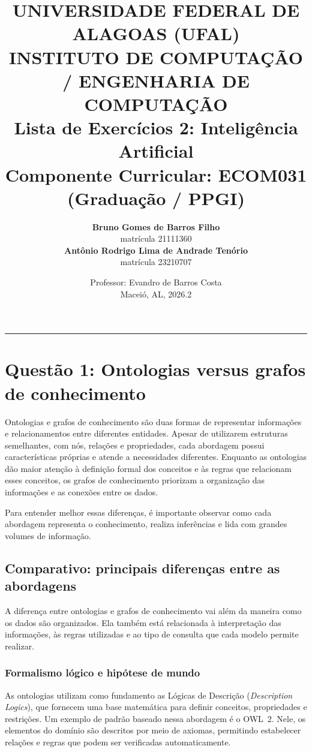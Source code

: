 \documentclass[12pt, a4paper]{article}
\title{
  {\large\textbf{UNIVERSIDADE FEDERAL DE ALAGOAS (UFAL)}}\\[0.2em]
  {\large\textbf{INSTITUTO DE COMPUTAÇÃO / ENGENHARIA DE COMPUTAÇÃO}}\\[1.5em]
  {\Large\bfseries\color{ufalblue} Lista de Exercícios 2: Inteligência Artificial}\\[0.4em]
  {\normalsize Componente Curricular: ECOM031 (Graduação / PPGI)}
}
\author{
  \textbf{Bruno Gomes de Barros Filho}\\
  matrícula 21111360\\[0.6em]
  \textbf{Antônio Rodrigo Lima de Andrade Tenório}\\
  matrícula 23210707
}
\date{
  Professor: Evandro de Barros Costa\\[0.3em]
  Maceió, AL, 2026.2
}
\begin{document}
\maketitle
\thispagestyle{empty}
\vspace{1em}
\hrule
\vspace{1.5em}

\tableofcontents
\newpage

\section{Questão 1: Ontologias versus grafos de conhecimento}
\label{sec:q1}

Ontologias e grafos de conhecimento são duas formas de representar informações e relacionamentos entre diferentes entidades. Apesar de utilizarem estruturas semelhantes, com nós, relações e propriedades, cada abordagem possui características próprias e atende a necessidades diferentes. Enquanto as ontologias dão maior atenção à definição formal dos conceitos e às regras que relacionam esses conceitos, os grafos de conhecimento priorizam a organização das informações e as conexões entre os dados.

Para entender melhor essas diferenças, é importante observar como cada abordagem representa o conhecimento, realiza inferências e lida com grandes volumes de informação.

\subsection{Comparativo: principais diferenças entre as abordagens}

A diferença entre ontologias e grafos de conhecimento vai além da maneira como os dados são organizados. Ela também está relacionada à interpretação das informações, às regras utilizadas e ao tipo de consulta que cada modelo permite realizar.

\subsubsection{Formalismo lógico e hipótese de mundo}

As ontologias utilizam como fundamento as Lógicas de Descrição (\textit{Description Logics}), que fornecem uma base matemática para definir conceitos, propriedades e restrições. Um exemplo de padrão baseado nessa abordagem é o OWL~2. Nele, os elementos do domínio são descritos por meio de axiomas, permitindo estabelecer relações e regras que podem ser verificadas automaticamente.
\end{document}
